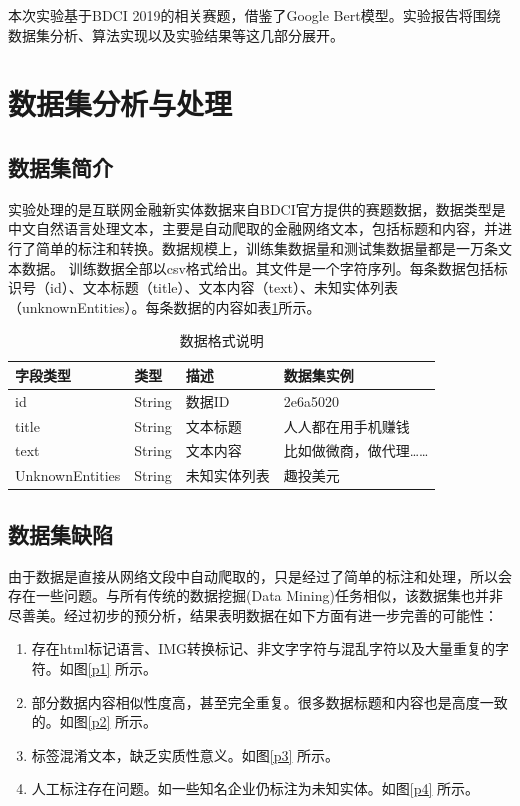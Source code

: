 \documentclass[11pt]{article}
\begin{document}
本次实验基于BDCI 2019的相关赛题，借鉴了Google Bert模型。实验报告将围绕数据集分析、算法实现以及实验结果等这几部分展开。

\section{数据集分析与处理}
\subsection{数据集简介}
实验处理的是互联网金融新实体数据来自BDCI官方提供的赛题数据，数据类型是中文自然语言处理文本，主要是自动爬取的金融网络文本，包括标题和内容，并进行了简单的标注和转换。数据规模上，训练集数据量和测试集数据量都是一万条文本数据。%
训练数据全部以csv格式给出。其文件是一个字符序列。每条数据包括标识号（id）、文本标题（title）、文本内容（text）、未知实体列表（unknownEntities）。每条数据的内容如表\ref{data_description}所示。
%
\tabcolsep=12pt
\begin{table}[!ht]
    \centering
    \begin{tabular}{llll}
        \toprule
        字段类型 & 类型 & 描述 & 数据集实例\\ \midrule
        id & String & 数据ID & 2e6a5020 \\
        title & String & 文本标题 & 人人都在用手机赚钱\\
        text & String & 文本内容 & 比如做微商，做代理……\\
        UnknownEntities & String & 未知实体列表 & 趣投美元 \\ 
        \bottomrule
    \end{tabular}
    \label{data_description}
    \caption{数据格式说明}
\end{table}

\subsection{数据集缺陷}
由于数据是直接从网络文段中自动爬取的，只是经过了简单的标注和处理，所以会存在一些问题。与所有传统的数据挖掘(Data Mining)任务相似，该数据集也并非尽善美。经过初步的预分析，结果表明数据在如下方面有进一步完善的可能性：
\begin{enumerate}[label=(\roman*)]
    \item 存在html标记语言、IMG转换标记、非文字字符与混乱字符以及大量重复的字符。如图\ref{p1} 所示。
    \item 部分数据内容相似性度高，甚至完全重复。很多数据标题和内容也是高度一致的。如图\ref{p2} 所示。
    \item 标签混淆文本，缺乏实质性意义。如图\ref{p3} 所示。
    \item 人工标注存在问题。如一些知名企业仍标注为未知实体。如图\ref{p4} 所示。
\end{enumerate}
\end{document}
